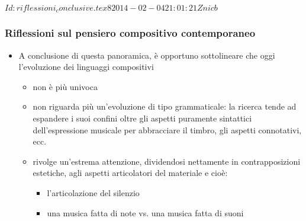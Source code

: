 %
%
\svnInfo $Id: riflessioni_conclusive.tex 8 2014-02-04 21:01:21Z nicb $

\setcounter{ms}{0}
\begin{frame}
    \frametitle{Riflessioni sul pensiero compositivo contemporaneo}

    \begin{itemize}

        \item A conclusione di questa panoramica, \`e opportuno sottolineare che
            oggi l'evoluzione dei linguaggi compositivi

        \begin{itemize}

            \item non \`e pi\`u univoca

            \item non riguarda pi\`u un'evoluzione di tipo grammaticale:
                la ricerca tende ad espandere i suoi confini
                oltre gli aspetti puramente sintattici
                dell'espressione musicale per abbracciare il timbro,
                gli aspetti connotativi, ecc.

            \item rivolge un'estrema attenzione,
                dividendosi nettamente in contrapposizioni estetiche,
                agli aspetti articolatori del materiale e cio\`e:

                \begin{itemize}

                    \item l'articolazione del silenzio

                    \item una musica fatta di note vs.  una musica fatta di suoni

                \end{itemize}

        \end{itemize}

    \end{itemize}

\end{frame}
